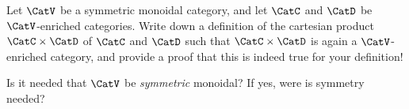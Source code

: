 
\begin{gradedexercise}
    \label{ex:ProductOfEnrichedCats}
    Let $\CatV$ be a symmetric monoidal category, and let $\CatC$ and $\CatD$ be $\CatV$-enriched categories. Write down a definition of the cartesian product $\CatC \times \CatD$ of $\CatC$ and $\CatD$ such that $\CatC \times \CatD$ is again a $\CatV$-enriched category, and provide a proof that this is indeed true for your definition!

    Is it needed that $\CatV$ be \emph{symmetric} monoidal? If yes, were is symmetry needed?
\end{gradedexercise}

